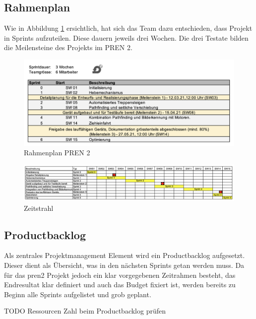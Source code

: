 \newpage
  
\subsection{Rahmenplan}
Wie in Abbildung \ref{fig:rahmenplan} ersichtlich, hat sich das Team dazu entschieden, dass Projekt in Sprints aufzuteilen. Diese dauern jeweils drei Wochen. Die drei Testate bilden die Meilensteine des Projekts im PREN 2.

\begin{figure}[H]
  \includegraphics[width=1.0\textwidth]{img/projektmanagement/Rahmenplan PREN2.png}
  \centering
  \caption{Rahmenplan PREN 2}
  \label{fig:rahmenplan}
\end{figure}

\begin{figure}[H]
  \includegraphics[width=1.0\textwidth]{img/projektmanagement/Zeitstrahl.png}
  \centering
  \caption{Zeitstrahl}
  \label{fig:sprint-backlog-1}
\end{figure}

\newpage

\subsection{Productbacklog}
Als zentrales Projektmanagement Element wird ein Productbacklog aufgesetzt. Dieser dient als Übersicht, was in den nächsten Sprints getan werden muss. Da für das \acrshort{pren2} Projekt jedoch ein klar vorgegebenen Zeitrahmen besteht, das Endresultat klar definiert und auch das Budget fixiert ist, werden bereits zu Beginn alle Sprints aufgelistet und grob geplant. 

TODO Ressourcen Zahl beim Productbacklog prüfen

